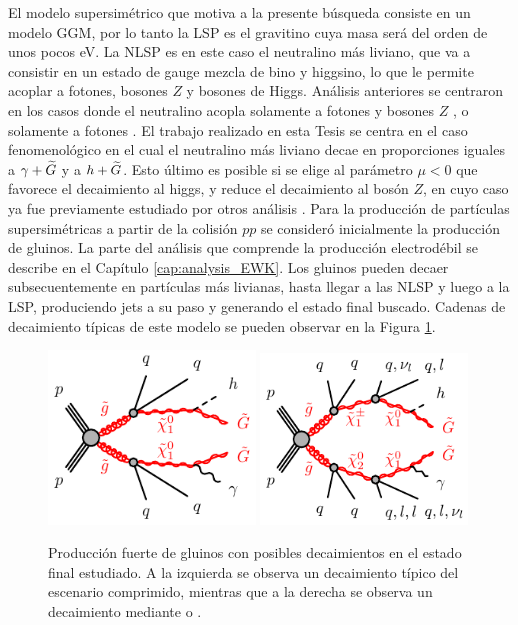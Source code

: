 El modelo supersimétrico que motiva a la presente búsqueda consiste en un modelo GGM, por lo tanto la LSP es el gravitino cuya masa será del orden de unos pocos eV. La NLSP es en este caso el neutralino más liviano, que va a consistir en un estado de gauge mezcla de bino y higgsino, lo que le permite acoplar a fotones, bosones $Z$ y bosones de Higgs.
Análisis anteriores se centraron en los casos donde el neutralino acopla solamente a fotones y bosones $Z$ \cite{tesis_fran, tesis_joaco, Collaboration:2198651}, o solamente a fotones \cite{Jinnouchi:2233741}. El trabajo realizado en esta Tesis se centra en el caso fenomenológico en el cual el neutralino más liviano decae en proporciones iguales a $\gamma+\widetilde{G}$ y a $h+\widetilde{G}$. Esto último es posible si se elige al parámetro $\mu<0$ que favorece el decaimiento al higgs, y reduce %
el decaimiento al bosón $Z$, en cuyo caso ya fue previamente estudiado por otros análisis \cite{tesis_fran, tesis_joaco}. Para la producción de partículas supersimétricas a partir de la colisión $pp$ se consideró inicialmente la producción de gluinos. La parte del análisis que comprende la producción electrodébil se describe en el Capítulo \ref{cap:analysis_EWK}. Los gluinos pueden decaer subsecuentemente en partículas más livianas, hasta llegar a las NLSP y luego a la LSP, produciendo jets 
a su paso y generando el estado final buscado. Cadenas de decaimiento típicas de este modelo se pueden observar en la Figura \ref{fig:phb_feyn}.

\begin{figure}
  \centering
  \includegraphics[width=0.49\textwidth]{images/analysis/gogo-qqqqbbphGG-h_short.pdf}
  \includegraphics[width=0.49\textwidth]{images/analysis/gogo-qqqqbbphGG-h_long.pdf}
  \caption{Producción fuerte de gluinos con posibles decaimientos en el estado final estudiado. A la izquierda se observa un decaimiento típico del escenario comprimido, mientras que a la derecha se observa un decaimiento mediante \ninotwo o \chinoonepm.}
  \label{fig:phb_feyn}
\end{figure}

